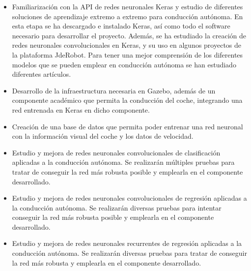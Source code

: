 \begin{itemize}
    \item Familiarización con la API de redes neuronales Keras y estudio de diferentes soluciones de aprendizaje extremo a extremo para conducción autónoma. En esta etapa se ha descargado e instalado Keras, así como todo el software necesario para desarrollar el proyecto. Además, se ha estudiado la creación de redes neuronales convolucionales en Keras, y su uso en algunos proyectos de la plataforma JdeRobot. Para tener una mejor comprensión de los diferentes modelos que se pueden emplear en conducción autónoma se han estudiado diferentes artículos.
    
    \item Desarrollo de la infraestructura necesaria en Gazebo, además de un componente académico que permita la conducción del coche, integrando una red entrenada en Keras en dicho componente.
    
    \item Creación de una base de datos que permita poder entrenar una red neuronal con la información visual del coche y los datos de velocidad.
    
    \item Estudio y mejora de redes neuronales convolucionales de clasificación aplicadas a la conducción autónoma. Se realizarán múltiples pruebas para tratar de conseguir la red más robusta posible y emplearla en el componente desarrollado.
    
    \item Estudio y mejora de redes neuronales convolucionales de regresión aplicadas a la conducción autónoma. Se realizarán diversas pruebas para intentar conseguir la red más robusta posible y emplearla en el componente desarrollado.
    
    \item Estudio y mejora de redes neuronales recurrentes de regresión aplicadas a la conducción autónoma. Se realizarán diversas pruebas para tratar de conseguir la red más robusta y emplearla en el componente desarrollado.
\end{itemize}

